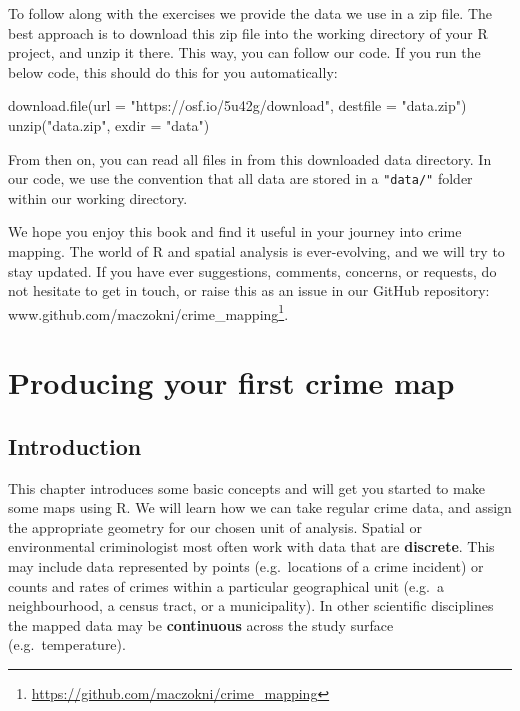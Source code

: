 \documentclass[
  krantz2]{krantz}
\makeatletter
\newenvironment{Shaded}{\begin{snugshade}}{\end{snugshade}}
\newcommand{\AttributeTok}[1]{\textcolor[rgb]{0.61,0.61,0.61}{#1}}
\newcommand{\FunctionTok}[1]{\textcolor[rgb]{0,0,0}{#1}}
\newcommand{\NormalTok}[1]{#1}
\newcommand{\StringTok}[1]{\textcolor[rgb]{0.5,0.5,0.5}{#1}}
\renewcommand{\href}[2]{#2\footnote{\url{#1}}}
\newenvironment{kframe}{%
\medskip{}
\setlength{\fboxsep}{.8em}
 \def\at@end@of@kframe{}%
 \ifinner\ifhmode%
  \def\at@end@of@kframe{\end{minipage}}%
  \begin{minipage}{\columnwidth}%
 \fi\fi%
 \def\FrameCommand##1{\hskip\@totalleftmargin \hskip-\fboxsep
 \colorbox{shadecolor}{##1}\hskip-\fboxsep
     \hskip-\linewidth \hskip-\@totalleftmargin \hskip\columnwidth}%
 \MakeFramed {\advance\hsize-\width
   \@totalleftmargin\z@ \linewidth\hsize
   \@setminipage}}%
 {\par\unskip\endMakeFramed%
 \at@end@of@kframe}
\renewenvironment{Shaded}{\begin{kframe}}{\end{kframe}}
\makeatother
\begin{document}
To follow along with the exercises we provide the data we use in a zip file. The best approach is to download this zip file into the working directory of your R project, and unzip it there. This way, you can follow our code. If you run the below code, this should do this for you automatically:

\begin{Shaded}
\begin{Highlighting}[]
\FunctionTok{download.file}\NormalTok{(}\AttributeTok{url =} \StringTok{"https://osf.io/5u42g/download"}\NormalTok{, }
              \AttributeTok{destfile =} \StringTok{"data.zip"}\NormalTok{)}
\FunctionTok{unzip}\NormalTok{(}\StringTok{"data.zip"}\NormalTok{, }\AttributeTok{exdir =} \StringTok{"data"}\NormalTok{)}
\end{Highlighting}
\end{Shaded}

From then on, you can read all files in from this downloaded data directory. In our code, we use the convention that all data are stored in a \texttt{"data/"} folder within our working directory.

We hope you enjoy this book and find it useful in your journey into crime mapping. The world of R and spatial analysis is ever-evolving, and we will try to stay updated. If you have ever suggestions, comments, concerns, or requests, do not hesitate to get in touch, or raise this as an issue in our GitHub repository: \href{https://github.com/maczokni/crime_mapping}{www.github.com/maczokni/crime\_mapping}.

\mainmatter

\hypertarget{producing-your-first-crime-map}{%
\chapter{Producing your first crime map}\label{producing-your-first-crime-map}}

\hypertarget{introduction}{%
\section{Introduction}\label{introduction}}

This chapter introduces some basic concepts and will get you started to make some maps using R. We will learn how we can take regular crime data, and assign the appropriate geometry for our chosen unit of analysis. Spatial or environmental criminologist most often work with data that are \textbf{discrete}. This may include data represented by points (e.g.~locations of a crime incident) or counts and rates of crimes within a particular geographical unit (e.g.~a neighbourhood, a census tract, or a municipality). In other scientific disciplines the mapped data may be \textbf{continuous} across the study surface (e.g.~temperature).
\end{document}
